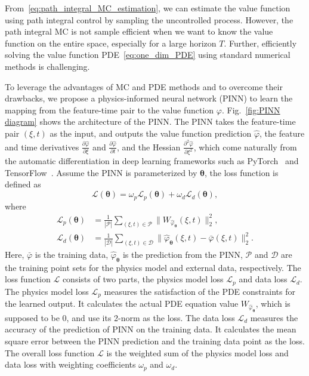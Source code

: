 \documentclass[letterpaper]{article} %
\begin{document}
From~\eqref{eq:path_integral_MC_estimation}, we can estimate the value function using path integral control by sampling the uncontrolled process. However, the path integral MC is not sample efficient when we want to know the value function on the entire space, especially for a large horizon $T$. Further, efficiently solving the value function PDE~\eqref{eq:one_dim_PDE} using standard numerical methods is challenging.

To leverage the advantages of MC and PDE methods and to overcome their drawbacks, we propose a physics-informed neural network (PINN) to learn the mapping from the feature-time pair to the value function $\varphi$.
Fig.~\ref{fig:PINN diagram} shows the architecture of the PINN. The PINN takes the feature-time pair $(\xi,t)$ as the input, and outputs the value function prediction $\hat{\varphi}$, the feature and time derivatives $ \frac{\partial \hat \varphi}{\partial \xi}$ and $ \frac{\partial \hat \varphi}{\partial t}$, and the Hessian $ \frac{\partial^2 \hat \varphi}{\partial \xi^2}$, which come naturally from the automatic differentiation in deep learning frameworks such as PyTorch~\cite{paszke2019pytorch} and TensorFlow~\cite{abadi2016tensorflow}.
Assume the PINN is parameterized by $\boldsymbol\theta$, the loss function is defined as
\begin{equation}
\label{eq:PINN overall loss function}
    \mathcal{L}(\boldsymbol\theta) = \omega_p \mathcal{L}_p(\boldsymbol\theta) + \omega_d \mathcal{L}_d(\boldsymbol\theta),
\end{equation}
where
\begin{equation}
\label{eq:PINN loss functions}
\begin{aligned}
    \mathcal{L}_p(\boldsymbol\theta) & = \frac{1}{|\mathcal{P}|} \sum_{(\xi,t) \in \mathcal{P}} \|W_{\hat{\varphi}_{\boldsymbol\theta}}(\xi,t)\|_2^2, \\
    \mathcal{L}_d(\boldsymbol\theta) & = \frac{1}{|\mathcal{D}|} \sum_{(\xi,t) \in \mathcal{D}} \|\hat{\varphi}_{\boldsymbol\theta}(\xi,t) - \bar{\varphi}(\xi,t)\|_2^2.
\end{aligned}
\end{equation}
Here, $\bar{\varphi}$ is the training data, $\hat{\varphi}_{\boldsymbol\theta}$ is the prediction from the PINN, $\mathcal{P}$ and $\mathcal{D}$ are the training point sets for the physics model and external data, respectively. The loss function $\mathcal{L}$ consists of two parts, the physics model loss $\mathcal{L}_p$ and data loss $\mathcal{L}_d$. The physics model loss $\mathcal{L}_p$ measures the satisfaction of the PDE constraints for the learned output. It calculates the actual PDE equation value $W_{\hat{\varphi}_{\boldsymbol\theta}}$, which is supposed to be $0$, and use its 2-norm as the loss. The data loss $\mathcal{L}_d$ measures the accuracy of the prediction of PINN on the training data. It calculates the mean square error between the PINN prediction and the training data point as the loss. The overall loss function $\mathcal{L}$ is the weighted sum of the physics model loss and data loss with weighting coefficients $\omega_p$ and $\omega_d$.
\end{document}
